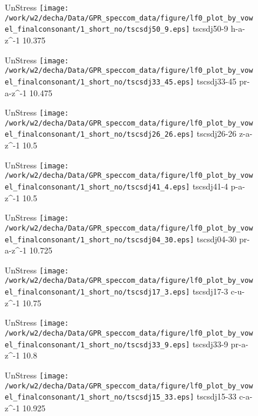 \documentclass{article}
\begin{document}
\begin{figure}[t]
\begin{minipage}[b]{.24\textwidth}
UnStress
\centering
\texttt{[image: /work/w2/decha/Data/GPR\_speccom\_data/figure/lf0\_plot\_by\_vowel\_finalconsonant/1\_short\_no/tscsdj50\_9.eps]}
tscsdj50-9 h-a-z\textasciicircum-1 10.375
\end{minipage}
\begin{minipage}[b]{.24\textwidth}
UnStress
\centering
\texttt{[image: /work/w2/decha/Data/GPR\_speccom\_data/figure/lf0\_plot\_by\_vowel\_finalconsonant/1\_short\_no/tscsdj33\_45.eps]}
tscsdj33-45 pr-a-z\textasciicircum-1 10.475
\end{minipage}
\begin{minipage}[b]{.24\textwidth}
UnStress
\centering
\texttt{[image: /work/w2/decha/Data/GPR\_speccom\_data/figure/lf0\_plot\_by\_vowel\_finalconsonant/1\_short\_no/tscsdj26\_26.eps]}
tscsdj26-26 z-a-z\textasciicircum-1 10.5
\end{minipage}
\begin{minipage}[b]{.24\textwidth}
UnStress
\centering
\texttt{[image: /work/w2/decha/Data/GPR\_speccom\_data/figure/lf0\_plot\_by\_vowel\_finalconsonant/1\_short\_no/tscsdj41\_4.eps]}
tscsdj41-4 p-a-z\textasciicircum-1 10.5
\end{minipage}
\end{figure}
\clearpage
\begin{figure}[t]
\begin{minipage}[b]{.24\textwidth}
UnStress
\centering
\texttt{[image: /work/w2/decha/Data/GPR\_speccom\_data/figure/lf0\_plot\_by\_vowel\_finalconsonant/1\_short\_no/tscsdj04\_30.eps]}
tscsdj04-30 pr-a-z\textasciicircum-1 10.725
\end{minipage}
\begin{minipage}[b]{.24\textwidth}
UnStress
\centering
\texttt{[image: /work/w2/decha/Data/GPR\_speccom\_data/figure/lf0\_plot\_by\_vowel\_finalconsonant/1\_short\_no/tscsdj17\_3.eps]}
tscsdj17-3 c-u-z\textasciicircum-1 10.75
\end{minipage}
\begin{minipage}[b]{.24\textwidth}
UnStress
\centering
\texttt{[image: /work/w2/decha/Data/GPR\_speccom\_data/figure/lf0\_plot\_by\_vowel\_finalconsonant/1\_short\_no/tscsdj33\_9.eps]}
tscsdj33-9 pr-a-z\textasciicircum-1 10.8
\end{minipage}
\begin{minipage}[b]{.24\textwidth}
UnStress
\centering
\texttt{[image: /work/w2/decha/Data/GPR\_speccom\_data/figure/lf0\_plot\_by\_vowel\_finalconsonant/1\_short\_no/tscsdj15\_33.eps]}
tscsdj15-33 c-a-z\textasciicircum-1 10.925
\end{minipage}
\end{figure}
\end{document}
